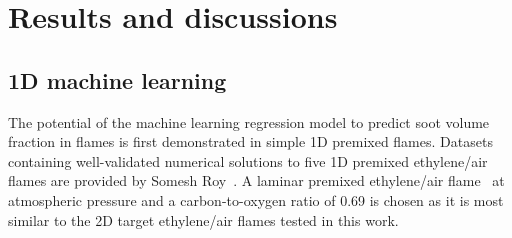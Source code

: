 \documentclass[12pt]{CHT-20}
\begin{document}









\section{Results and discussions} \label{sec:results}

\subsection{1D machine learning}
The potential of the machine learning regression model to predict soot volume fraction in flames is first demonstrated in simple 1D premixed flames. Datasets containing well-validated numerical solutions to five 1D premixed ethylene/air flames are provided by Somesh Roy~\citep[]{Roy_Haworth,Roy}. A laminar premixed ethylene/air flame~\citep[]{Kazakov1995} at atmospheric pressure and a carbon-to-oxygen ratio of 0.69 is chosen as it is most similar to the 2D target ethylene/air flames tested in this work.
\end{document}
